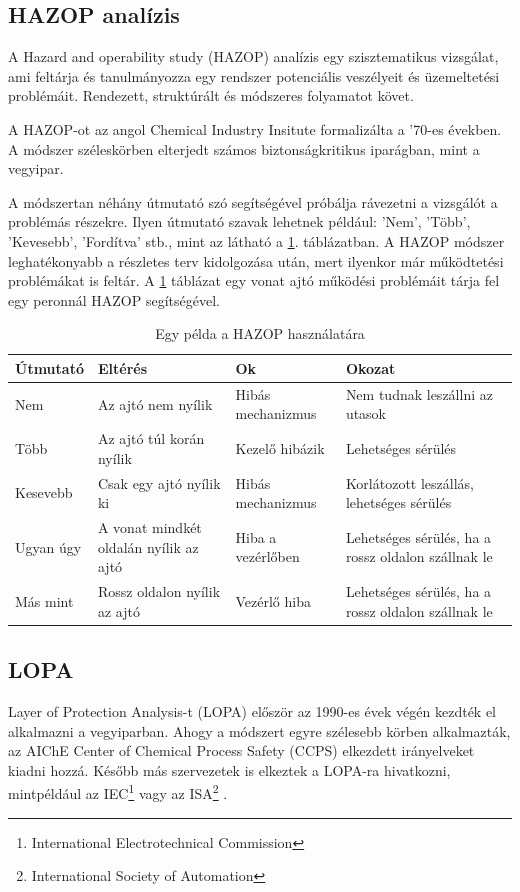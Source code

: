 \subsection{HAZOP analízis}
A Hazard and operability study (HAZOP) analízis egy szisztematikus vizsgálat, ami feltárja és tanulmányozza egy rendszer potenciális veszélyeit és üzemeltetési problémáit.
Rendezett, struktúrált és módszeres folyamatot követ\cite{Ericson}.

A HAZOP-ot az angol Chemical Industry Insitute formalizálta a '70-es években.
A módszer széleskörben elterjedt számos biztonságkritikus iparágban, mint a vegyipar.

A módszertan néhány útmutató szó segítségével próbálja rávezetni a vizsgálót a problémás részekre.
Ilyen útmutató szavak lehetnek például: 'Nem', 'Több', 'Kevesebb', 'Fordítva' stb., mint az látható a \ref{tab:hazop}. táblázatban.
A HAZOP módszer leghatékonyabb a részletes terv kidolgozása után, mert ilyenkor már működtetési problémákat is feltár.
A \ref{tab:hazop} táblázat egy vonat ajtó működési problémáit tárja fel egy peronnál HAZOP segítségével.

\begin{table}[!ht]
    \footnotesize
    \begin{tabular}{|l p{25mm} p{25mm} p{25mm}|}
        \toprule
        Útmutató & Eltérés & Ok & Okozat \\
        \midrule
        Nem & Az ajtó nem nyílik & Hibás mechanizmus & Nem tudnak leszállni az utasok \\
        \midrule
        Több & Az ajtó túl korán nyílik & Kezelő hibázik & Lehetséges sérülés \\ 
        \midrule
        Kesevebb & Csak egy ajtó nyílik ki & Hibás mechanizmus & Korlátozott leszállás, lehetséges sérülés\\ 
        \midrule
        Ugyan úgy & A vonat mindkét oldalán nyílik az ajtó & Hiba a vezérlőben & Lehetséges sérülés, ha a rossz oldalon szállnak le\\ 
        \midrule
        Más mint & Rossz oldalon nyílik az ajtó & Vezérlő hiba & Lehetséges sérülés, ha a rossz oldalon szállnak le \\
        \bottomrule
    \end{tabular}
    \caption{Egy példa a HAZOP használatára}
    \label{tab:hazop}
\end{table}

\subsection{LOPA}
Layer of Protection Analysis-t (LOPA) először az 1990-es évek végén kezdték el alkalmazni a vegyiparban.
Ahogy a módszert egyre szélesebb körben alkalmazták, az AIChE Center of Chemical Process Safety (CCPS) elkezdett irányelveket kiadni hozzá.
Később más szervezetek is elkeztek a LOPA-ra hivatkozni, mintpéldául az IEC\footnote{International Electrotechnical Commission} vagy az ISA\footnote{International Society of Automation} \cite{WILLEY201412}.

